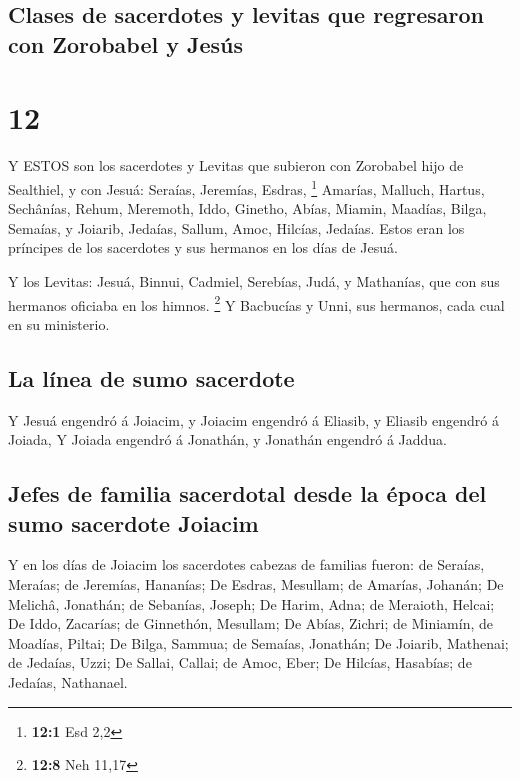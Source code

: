 \hypertarget{clases-de-sacerdotes-y-levitas-que-regresaron-con-zorobabel-y-jesuxfas}{%
\subsection{Clases de sacerdotes y levitas que regresaron con Zorobabel
y
Jesús}\label{clases-de-sacerdotes-y-levitas-que-regresaron-con-zorobabel-y-jesuxfas}}

\hypertarget{section-11}{%
\section{12}\label{section-11}}

 Y ESTOS son los sacerdotes y Levitas que subieron con
Zorobabel hijo de Sealthiel, y con Jesuá: Seraías, Jeremías, Esdras,
\footnote{\textbf{12:1} Esd 2,2}  Amarías, Malluch, Hartus,
 Sechânías, Rehum, Meremoth,  Iddo, Ginetho,
Abías,  Miamin, Maadías, Bilga,  Semaías, y
Joiarib, Jedaías,  Sallum, Amoc, Hilcías, Jedaías. Estos
eran los príncipes de los sacerdotes y sus hermanos en los días de
Jesuá.

 Y los Levitas: Jesuá, Binnui, Cadmiel, Serebías, Judá, y
Mathanías, que con sus hermanos oficiaba en los himnos. \footnote{\textbf{12:8}
  Neh 11,17}  Y Bacbucías y Unni, sus hermanos, cada cual en
su ministerio.

\hypertarget{la-luxednea-de-sumo-sacerdote}{%
\subsection{La línea de sumo
sacerdote}\label{la-luxednea-de-sumo-sacerdote}}

 Y Jesuá engendró á Joiacim, y Joiacim engendró á Eliasib,
y Eliasib engendró á Joiada,  Y Joiada engendró á Jonathán,
y Jonathán engendró á Jaddua.

\hypertarget{jefes-de-familia-sacerdotal-desde-la-uxe9poca-del-sumo-sacerdote-joiacim}{%
\subsection{Jefes de familia sacerdotal desde la época del sumo
sacerdote
Joiacim}\label{jefes-de-familia-sacerdotal-desde-la-uxe9poca-del-sumo-sacerdote-joiacim}}

 Y en los días de Joiacim los sacerdotes cabezas de
familias fueron: de Seraías, Meraías; de Jeremías, Hananías;
 De Esdras, Mesullam; de Amarías, Johanán;  De
Melichâ, Jonathán; de Sebanías, Joseph;  De Harim, Adna; de
Meraioth, Helcai;  De Iddo, Zacarías; de Ginnethón,
Mesullam;  De Abías, Zichri; de Miniamín, de Moadías,
Piltai;  De Bilga, Sammua; de Semaías, Jonathán;
 De Joiarib, Mathenai; de Jedaías, Uzzi;  De
Sallai, Callai; de Amoc, Eber;  De Hilcías, Hasabías; de
Jedaías, Nathanael.

